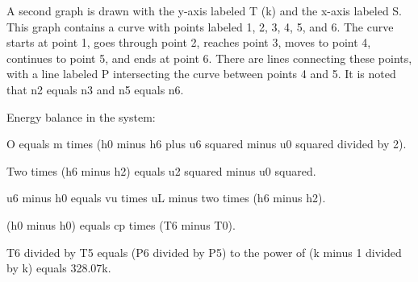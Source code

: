 A second graph is drawn with the y-axis labeled T (k) and the x-axis labeled S. This graph contains a curve with points labeled 1, 2, 3, 4, 5, and 6. The curve starts at point 1, goes through point 2, reaches point 3, moves to point 4, continues to point 5, and ends at point 6. There are lines connecting these points, with a line labeled P intersecting the curve between points 4 and 5. It is noted that n2 equals n3 and n5 equals n6.

Energy balance in the system:

O equals m times (h0 minus h6 plus u6 squared minus u0 squared divided by 2).

Two times (h6 minus h2) equals u2 squared minus u0 squared.

u6 minus h0 equals vu times uL minus two times (h6 minus h2).

(h0 minus h0) equals cp times (T6 minus T0).

T6 divided by T5 equals (P6 divided by P5) to the power of (k minus 1 divided by k) equals 328.07k.